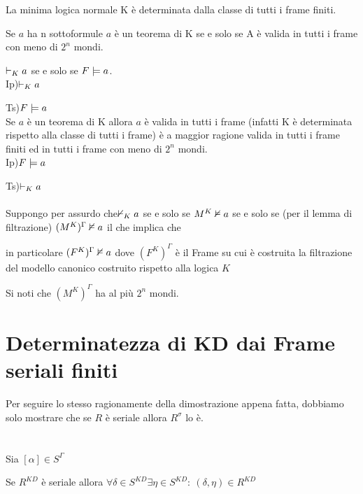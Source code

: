 La minima logica normale K è determinata dalla classe di tutti i frame
finiti.

Se $a$ ha n sottoformule $a$ è un teorema di K se e solo se A è
valida in tutti i frame con meno di $2^{n}$ mondi. 

$\vdash_{K}a$ se e solo se $F\models a$.\\


Ip)$\vdash_{K}a$ 

Ts)$F\models a$\\


Se $a$ è un teorema di K allora $a$ è valida in tutti i frame (infatti
K è determinata rispetto alla classe di tutti i frame) è a maggior
ragione valida in tutti i frame finiti ed in tutti i frame con meno
di $2^{n}$ mondi.\\


Ip)$F\models a$

Ts)$\vdash_{K}a$\\
\\
Suppongo per assurdo che$\nvdash_{K}a$ se e solo se $M^{K}\nvDash a$
se e solo se (per il lemma di filtrazione) $(M^{K})^{\Gamma}\nvDash a$
il che implica che

in particolare $(F^{K})^{\Gamma}\nvDash a$ dove $(F^{K})^{\Gamma}$
è il Frame su cui è costruita la filtrazione del modello canonico
costruito rispetto alla logica $K$ 

Si noti che $(M^{K})^{\Gamma}$ ha al più $2^{n}$ mondi.


\section{Determinatezza di KD dai Frame seriali finiti}

Per seguire lo stesso ragionamente della dimostrazione appena fatta,
dobbiamo solo mostrare che se $R$ è seriale allora $R^{\sigma}$
lo è.\\


\\
\\
Sia $[\alpha]\in S^{\Gamma}$

Se $R^{KD}$ è seriale allora $\forall\delta\in S^{KD}\exists\eta\in S^{KD}:\ (\delta,\eta)\in R^{KD}$

